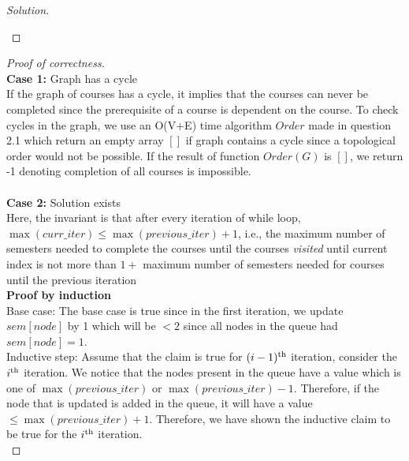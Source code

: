 \begin{solution}{2.2}
\begin{proof}[Solution]
\begin{algorithm}[H]
\begin{algorithmic}
             
                     
                \EndIf{}
            \EndFor{}
        \EndWhile{}
        \EndProcedure
        \end{algorithmic}
        \end{algorithm}
    \end{proof}
    \begin{proof}[Proof of correctness]\\
        \textbf{Case 1:} Graph has a cycle\\
        If the graph of courses has a cycle, it implies that the courses can never be completed since the prerequisite of a course is dependent on the course. To check cycles in the graph, we use an O(V+E) time algorithm $Order$ made in question 2.1 which return an empty array $[]$ if graph contains a cycle since a topological order would not be possible. If the result of function $Order(G)$ is $[]$, we return -1 denoting completion of all courses is impossible.\\
        \\
        \textbf{Case 2:} Solution exists\\
        Here, the invariant is that after every iteration of while loop, $\max(curr\_iter)\leq \max(previous\_iter) + 1$, i.e., the maximum number of semesters needed to complete the courses until the courses \textit{visited} until current index is not more than $1+$ maximum number of semesters needed for courses until the previous iteration\\
        \textbf{Proof by induction}\\
        Base case: The base case is true since in the first iteration, we update $sem[node]$ by 1 which will be $<2$ since all nodes in the queue had $sem[node]=1$.\\
        Inductive step: Assume that the claim is true for $(i-1)\textsuperscript{th}$ iteration, consider the $i\textsuperscript{th}$ iteration. We notice that the nodes present in the queue have a value which is one of $\max(previous\_iter)$ or $\max(previous\_iter)-1$. Therefore, if the node that is updated is added in the queue, it will have a value $\leq\max(previous\_iter)+1$. Therefore, we have shown the inductive claim to be true for the $i\textsuperscript{th}$ iteration.\\

\end{proof}
\end{solution}
